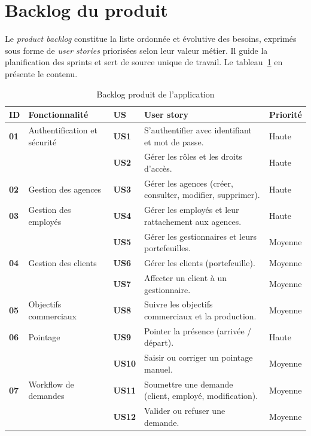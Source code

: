 \section{Backlog du produit}
Le \emph{product backlog} constitue la liste ordonnée et évolutive des besoins,
exprimés sous forme de \emph{user stories} priorisées selon leur valeur métier.
Il guide la planification des sprints et sert de source unique de travail. Le
tableau~\ref{tab:backlog} en présente le contenu.

\begin{table}[htbp]
\centering
\caption{Backlog produit de l'application}
\label{tab:backlog}
\renewcommand{\arraystretch}{1.2}
\begin{tabularx}{\textwidth}{>{\bfseries}p{0.7cm}p{2.6cm}>{\bfseries}p{1cm}Xp{1.5cm}}
\toprule
\textmd{\textbf{ID}} & \textbf{Fonctionnalité} & \textmd{\textbf{US}} &
\textbf{User story} & \textbf{Priorité}\\
\midrule
01 & Authentification et sécurité & US1 & S'authentifier avec identifiant et mot de passe. & Haute\\
   &                              & US2 & Gérer les rôles et les droits d'accès. & Haute\\
\midrule
02 & Gestion des agences & US3 & Gérer les agences (créer, consulter, modifier, supprimer). & Haute\\
\midrule
03 & Gestion des employés & US4 & Gérer les employés et leur rattachement aux agences. & Haute\\
   &                      & US5 & Gérer les gestionnaires et leurs portefeuilles. & Moyenne\\
\midrule
04 & Gestion des clients & US6 & Gérer les clients (portefeuille). & Moyenne\\
   &                     & US7 & Affecter un client à un gestionnaire. & Moyenne\\
\midrule
05 & Objectifs commerciaux & US8 & Suivre les objectifs commerciaux et la production. & Moyenne\\
\midrule
06 & Pointage & US9 & Pointer la présence (arrivée / départ). & Haute\\
   &          & US10 & Saisir ou corriger un pointage manuel. & Moyenne\\
\midrule
07 & Workflow de demandes & US11 & Soumettre une demande (client, employé, modification). & Moyenne\\
   &                      & US12 & Valider ou refuser une demande. & Moyenne\\

\end{tabularx}
\end{table}
